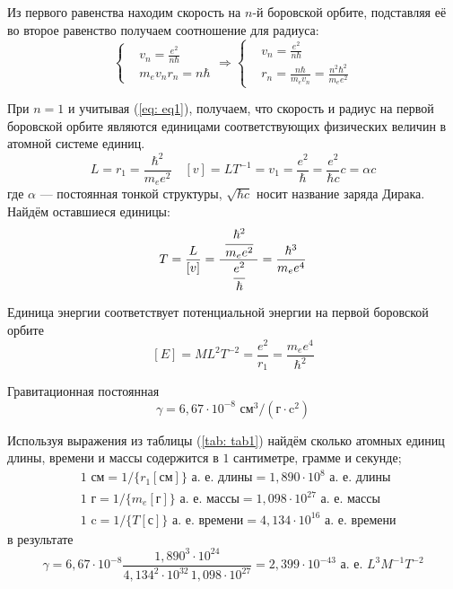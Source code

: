 \documentclass[a4paper,14pt]{extarticle} %
\begin{document}
	Из первого равенства находим скорость на \(n\)-й боровской орбите, подставляя её во второе равенство получаем соотношение для радиуса:
	\begin{equation*}
	\left\{
	\begin{aligned}
		& v_n = \frac{e^2}{n\hbar} \\
		& m_e v_n r_n = n\hbar
	\end{aligned}
	\right.	
	\Rightarrow
	\left\{
	\begin{aligned}
		& v_n = \frac{e^2}{n\hbar} \\
		& r_n = \frac{n\hbar}{m_e v_n} = \frac{n^2\hbar^2}{m_e e^2}
	\end{aligned}
	\right.	
	\end{equation*}
	
	При \(n = 1\) и учитывая (\ref{eq: eq1}), получаем, что скорость и радиус на первой боровской орбите являются единицами соответствующих физических величин в атомной системе единиц.
	\[
	L = r_1 = \frac{\hbar^2}{m_e e^2} \quad
	[v] = LT^{-1} = v_1 = \frac{e^2}{\hbar} = \frac{e^2}{\hbar c} c = \alpha c
	\]
	где \(\alpha\) --- постоянная тонкой структуры, \(\sqrt{\hbar c}\) носит название заряда Дирака. Найдём оставшиеся единицы:
	\[
	T = \frac{L}{[v]} = \frac{~\cfrac{\hbar^2}{m_e e^2}~}{\cfrac{e^2}{\hbar}} = \frac{\hbar^3}{m_e e^4}
	\]
	
	Единица энергии соответствует  потенциальной энергии на первой боровской орбите
	\[
	[E]=ML^2T^{-2} = \frac{e^2}{r_1} = \frac{m_e e^4}{\hbar^2}
	\]
	
	Гравитационная постоянная
	\[
	\gamma = 6,67\cdot10^{-8}\text{ см}^3/(\text{г}\cdot\text{c}^2)
	\]
	
	Используя выражения из таблицы (\ref{tab: tab1}) найдём сколько атомных единиц длины, времени и массы содержится в \(1\) сантиметре, грамме и секунде;
	{
	\begin{equation*}
	\begin{split}
	& 1\text{~см} = 1/\{r_1[\text{см}]\} \text{~а.~е.~длины} =
		1,890\cdot10^{8} \text{~а.~е.~длины} \\
	& 1\text{~г} = 1/\{m_e[\text{г}]\} \text{~а.~е.~массы} = 
		1,098\cdot10^{27} \text{~а.~е.~массы} \\
	& 1\text{~c} = 1/\{T[\text{с}]\} \text{~а.~е.~времени} = 
	4,134\cdot10^{16} \text{~а.~е.~времени}		
	\end{split}
	\end{equation*}
	}
	в результате 
	\[
	\gamma = 
	6,67\cdot10^{-8} \frac{1,890^3\cdot10^{24}}{4,134^2\cdot10^{32}\, 1,098\cdot10^{27}} = 2,399\cdot10^{-43}  \text{~а.~е.~}L^3M^{-1}T^{-2}
	\]
	
\end{document}
